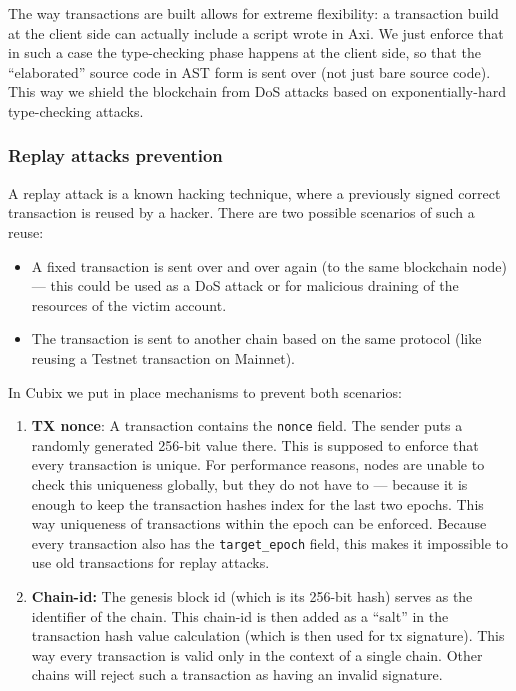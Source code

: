 \documentclass[a4paper]{article}
\newcommand{\code}[1]{{\small \texttt{#1}}}
\begin{document}
The way transactions are built allows for extreme flexibility: a transaction build at the client side can actually include a script wrote in Axi. We just enforce that in such a case the type-checking phase happens at the client side, so that the ``elaborated'' source code in AST form is sent over (not just bare source code). This way we shield the blockchain from DoS attacks based on exponentially-hard type-checking attacks.

\subsubsection{Replay attacks prevention}

A replay attack is a known hacking technique, where a previously signed correct transaction is reused by a hacker. There are two possible scenarios of such a reuse:

\begin{itemize}
  \item A fixed transaction is sent over and over again (to the same blockchain node) --- this could be used as a DoS attack or for malicious draining of the resources of the victim account.
  \item The transaction is sent to another chain based on the same protocol (like reusing a Testnet transaction on Mainnet).
\end{itemize}

In Cubix we put in place mechanisms to prevent both scenarios:

\begin{enumerate}
  \item \textbf{TX nonce}: A transaction contains the \code{nonce} field. The sender puts a randomly generated 256-bit value there. This is supposed to enforce that every transaction is unique. For performance reasons, nodes are unable to check this uniqueness globally, but they do not have to --- because it is enough to keep the transaction hashes index for the last two epochs. This way uniqueness of transactions within the epoch can be enforced. Because every transaction also has the \code{target\_epoch} field, this makes it impossible to use old transactions for replay attacks.
  \item \textbf{Chain-id:} The genesis block id (which is its 256-bit hash) serves as the identifier of the chain. This chain-id is then added as a ``salt'' in the transaction hash value calculation (which is then used for tx signature). This way every transaction is valid only in the context of a single chain. Other chains will reject such a transaction as having an invalid signature.
\end{enumerate}
\end{document}
